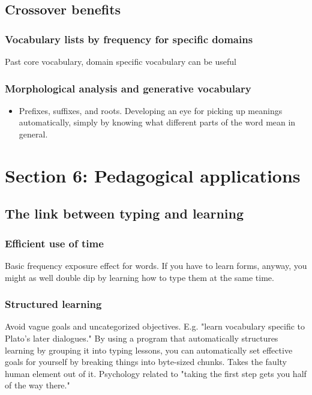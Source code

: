 \documentclass[11pt]{article}
\begin{document}
\subsection{Crossover benefits}
\label{sec:org3c335b0}

\subsubsection{Vocabulary lists by frequency for specific domains}
\label{sec:org135267d}

Past core vocabulary, domain specific vocabulary can be useful

\subsubsection{Morphological analysis and generative vocabulary}
\label{sec:org6e33f08}

\begin{itemize}
\item Prefixes, suffixes, and roots. Developing an eye for picking up meanings automatically, simply by knowing what different parts of the word mean in general.
\end{itemize}

\section{Section 6: Pedagogical applications}
\label{sec:orga72ff16}

\subsection{The link between typing and learning}
\label{sec:org52417fd}

\subsubsection{Efficient use of time}
\label{sec:orgcd110da}

Basic frequency exposure effect for words. If you have to learn forms, anyway, you might as well double dip by learning how to type them at the same time.

\subsubsection{Structured learning}
\label{sec:org813b844}

Avoid vague goals and uncategorized objectives. E.g. "learn vocabulary specific to Plato's later dialogues." By using a program that automatically structures learning by grouping it into typing lessons, you can automatically set effective goals for yourself by breaking things into byte-sized chunks. Takes the faulty human element out of it. Psychology related to "taking the first step gets you half of the way there."
\end{document}
